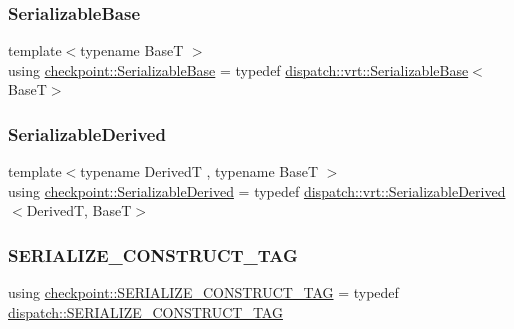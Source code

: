 \subsubsection{\texorpdfstring{Serializable\+Base}{SerializableBase}}
{\footnotesize\ttfamily template$<$typename BaseT $>$ \\
using \hyperlink{namespacecheckpoint_ae8adefa66d7575697f8e465bed48e3cc}{checkpoint\+::\+Serializable\+Base} = typedef \hyperlink{structcheckpoint_1_1dispatch_1_1vrt_1_1_serializable_base}{dispatch\+::vrt\+::\+Serializable\+Base}$<$BaseT$>$}

\mbox{\label{namespacecheckpoint_a9c4afb2c8d1bc1f58b9e158d64331d65}} 
\subsubsection{\texorpdfstring{Serializable\+Derived}{SerializableDerived}}
{\footnotesize\ttfamily template$<$typename DerivedT , typename BaseT $>$ \\
using \hyperlink{namespacecheckpoint_a9c4afb2c8d1bc1f58b9e158d64331d65}{checkpoint\+::\+Serializable\+Derived} = typedef \hyperlink{structcheckpoint_1_1dispatch_1_1vrt_1_1_serializable_derived}{dispatch\+::vrt\+::\+Serializable\+Derived}$<$DerivedT, BaseT$>$}

\mbox{\label{namespacecheckpoint_a7ff642cff4d72d01a16ab10e9bc363ef}} 
\subsubsection{\texorpdfstring{S\+E\+R\+I\+A\+L\+I\+Z\+E\+\_\+\+C\+O\+N\+S\+T\+R\+U\+C\+T\+\_\+\+T\+AG}{SERIALIZE\_CONSTRUCT\_TAG}}
{\footnotesize\ttfamily using \hyperlink{namespacecheckpoint_a7ff642cff4d72d01a16ab10e9bc363ef}{checkpoint\+::\+S\+E\+R\+I\+A\+L\+I\+Z\+E\+\_\+\+C\+O\+N\+S\+T\+R\+U\+C\+T\+\_\+\+T\+AG} = typedef \hyperlink{structcheckpoint_1_1dispatch_1_1_s_e_r_i_a_l_i_z_e___c_o_n_s_t_r_u_c_t___t_a_g}{dispatch\+::\+S\+E\+R\+I\+A\+L\+I\+Z\+E\+\_\+\+C\+O\+N\+S\+T\+R\+U\+C\+T\+\_\+\+T\+AG}}

